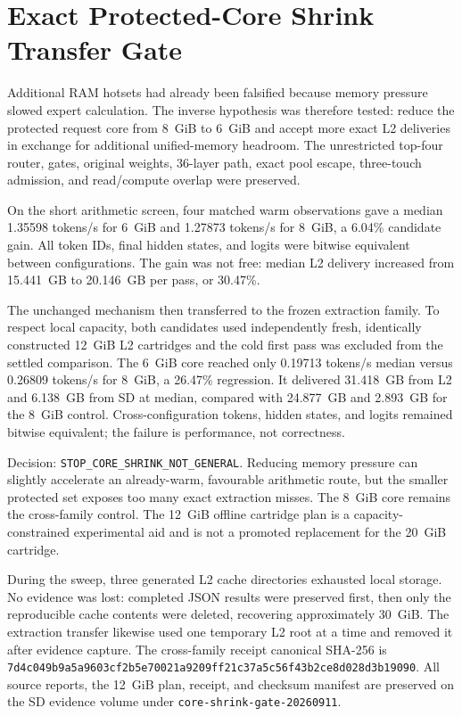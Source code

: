 \section{Exact Protected-Core Shrink Transfer Gate}
\label{sec:gptoss120b-core-shrink-20260911}

Additional RAM hotsets had already been falsified because memory pressure slowed
expert calculation.  The inverse hypothesis was therefore tested: reduce the
protected request core from 8~GiB to 6~GiB and accept more exact L2 deliveries in
exchange for additional unified-memory headroom.  The unrestricted top-four
router, gates, original weights, 36-layer path, exact pool escape, three-touch
admission, and read/compute overlap were preserved.

On the short arithmetic screen, four matched warm observations gave a median
1.35598 tokens/s for 6~GiB and 1.27873 tokens/s for 8~GiB, a 6.04\% candidate
gain.  All token IDs, final hidden states, and logits were bitwise equivalent
between configurations.  The gain was not free: median L2 delivery increased
from 15.441~GB to 20.146~GB per pass, or 30.47\%.

The unchanged mechanism then transferred to the frozen extraction family.  To
respect local capacity, both candidates used independently fresh, identically
constructed 12~GiB L2 cartridges and the cold first pass was excluded from the
settled comparison.  The 6~GiB core reached only 0.19713 tokens/s median versus
0.26809 tokens/s for 8~GiB, a 26.47\% regression.  It delivered 31.418~GB from
L2 and 6.138~GB from SD at median, compared with 24.877~GB and 2.893~GB for the
8~GiB control.  Cross-configuration tokens, hidden states, and logits remained
bitwise equivalent; the failure is performance, not correctness.

Decision: \texttt{STOP\_CORE\_SHRINK\_NOT\_GENERAL}.  Reducing memory pressure
can slightly accelerate an already-warm, favourable arithmetic route, but the
smaller protected set exposes too many exact extraction misses.  The 8~GiB core
remains the cross-family control.  The 12~GiB offline cartridge plan is a
capacity-constrained experimental aid and is not a promoted replacement for the
20~GiB cartridge.

During the sweep, three generated L2 cache directories exhausted local storage.
No evidence was lost: completed JSON results were preserved first, then only the
reproducible cache contents were deleted, recovering approximately 30~GiB.  The
extraction transfer likewise used one temporary L2 root at a time and removed it
after evidence capture.  The cross-family receipt canonical SHA-256 is
\texttt{7d4c049b9a5a9603cf2b5e70021a9209ff21c37a5c56f43b2ce8d028d3b19090}.
All source reports, the 12~GiB plan, receipt, and checksum manifest are preserved
on the SD evidence volume under \texttt{core-shrink-gate-20260911}.
